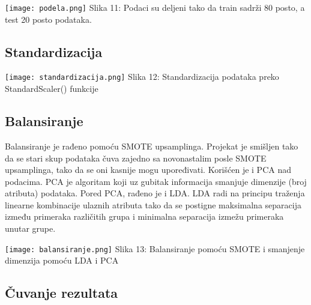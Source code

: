 \documentclass[a4paper]{article}
\begin{document}
{\noindent\begin{minipage}{1.0\textwidth}
\texttt{[image: podela.png]}
\hphantom{a}Slika 11: Podaci su deljeni tako da train sadrži 80 posto, a test 20 posto podataka.\\
\end{minipage}

\subsection{Standardizacija}
\label{standardizacija}

\noindent\begin{minipage}{1.0\textwidth}
\texttt{[image: standardizacija.png]}
\hphantom{aaaaaaaaa}Slika 12: Standardizacija podataka preko StandardScaler() funkcije\\
\end{minipage}

\subsection{Balansiranje}
\label{balansiranje}

Balansiranje je rađeno pomoću SMOTE upsamplinga. Projekat je smišljen tako da se stari skup podataka čuva zajedno sa novonastalim posle SMOTE upsamplinga, tako da se oni kasnije mogu upoređivati. Korišćen je i PCA nad podacima. PCA je algoritam koji uz gubitak informacija smanjuje dimenzije (broj atributa) podataka. Pored PCA, rađeno je i LDA. LDA radi na principu traženja linearne kombinacije ulaznih atributa tako da se postigne maksimalna separacija između primeraka različitih grupa i minimalna separacija izmežu primeraka unutar grupe.\\

\noindent\begin{minipage}{1.0\textwidth}
\texttt{[image: balansiranje.png]}
\hphantom{a}Slika 13: Balansiranje pomoću SMOTE i smanjenje dimenzija pomoću LDA i PCA\\
\end{minipage}

\subsection{Čuvanje rezultata}
\label{čuvanje}

}
\end{document}
